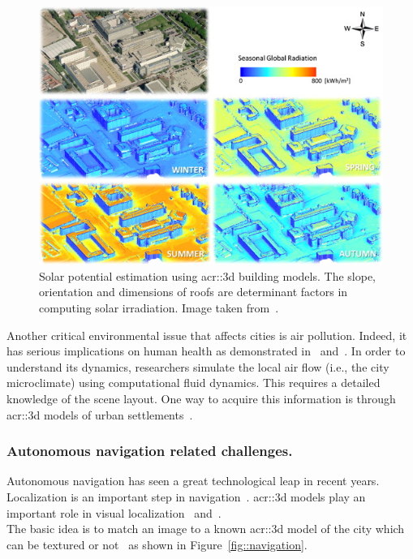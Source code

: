             \begin{figure}[htb]
                \centering
                \includegraphics[width=.7\textwidth]{images/introduction/3d_model_applications/solar_potential}
                \caption[
                    Solar potential estimation using building \acrshort*{acr::3d} models.
                ]{
                    \label{fig::solar_potential}
                    Solar potential estimation using \gls{acr::3d} building models.
                    The slope, orientation and dimensions of roofs are determinant factors in computing solar irradiation.
                    Image taken from~\parencite{redweik2013solar}.
                }
            \end{figure}

            Another critical environmental issue that affects cities is air pollution.
            Indeed, it has serious implications on human health as demonstrated in~\parencite{pascal2013assessing} and~\parencite{chen2013evidence}.
            In order to understand its dynamics, researchers simulate the local air flow (i.e., the city microclimate) using computational fluid dynamics.
            This requires a detailed knowledge of the scene layout.
            One way to acquire this information is through \gls{acr::3d} models of urban settlements~\parencite{ujang2013unified}.
       
        \subsubsection{Autonomous navigation related challenges.}
            Autonomous navigation has seen a great technological leap in recent years.
            Localization is an important step in navigation~\parencite{bonin2008visual}.
            \Gls{acr::3d} models play an important role in visual localization~\parencite{biljecki2015applications} and~\parencite{piasco2018survey}.\\
            The basic idea is to match an image to a known \gls{acr::3d} model of the city which can be textured or not~\parencite{cham2010estimating,ardeshir2014gis,arth2015instant,christie2016semantics} as shown in Figure~\ref{fig::navigation}.

